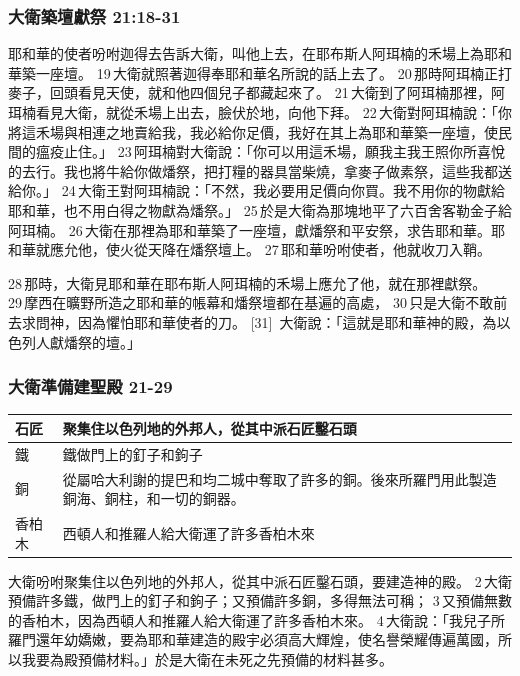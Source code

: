 \subsubsection{大衛築壇獻祭 21:18-31}
耶和華的使者吩咐迦得去告訴大衛，叫他上去，在耶布斯人阿珥楠的禾場上為耶和華築一座壇。 19 大衛就照著迦得奉耶和華名所說的話上去了。 20 那時阿珥楠正打麥子，回頭看見天使，就和他四個兒子都藏起來了。 21 大衛到了阿珥楠那裡，阿珥楠看見大衛，就從禾場上出去，臉伏於地，向他下拜。 22 大衛對阿珥楠說：「你將這禾場與相連之地賣給我，我必給你足價，我好在其上為耶和華築一座壇，使民間的瘟疫止住。」 23 阿珥楠對大衛說：「你可以用這禾場，願我主我王照你所喜悅的去行。我也將牛給你做燔祭，把打糧的器具當柴燒，拿麥子做素祭，這些我都送給你。」 24 大衛王對阿珥楠說：「不然，我必要用足價向你買。我不用你的物獻給耶和華，也不用白得之物獻為燔祭。」 25 於是大衛為那塊地平了六百舍客勒金子給阿珥楠。 26 大衛在那裡為耶和華築了一座壇，獻燔祭和平安祭，求告耶和華。耶和華就應允他，使火從天降在燔祭壇上。 27 耶和華吩咐使者，他就收刀入鞘。

28 那時，大衛見耶和華在耶布斯人阿珥楠的禾場上應允了他，就在那裡獻祭。 29 摩西在曠野所造之耶和華的帳幕和燔祭壇都在基遍的高處， 30 只是大衛不敢前去求問神，因為懼怕耶和華使者的刀。 [31]  大衛說：「這就是耶和華神的殿，為以色列人獻燔祭的壇。」


\subsubsection{大衛準備建聖殿 21-29}

\begin{table}
\vspace{-5mm}
\centering
\begin{tabular}{p{1.25cm}|p{8cm}}\hline\hline
石匠 &聚集住以色列地的外邦人，從其中派石匠鑿石頭  \\\hline\hline
鐵&鐵做門上的釘子和鉤子\\\hline 
銅&從屬哈大利謝的提巴和均二城中奪取了許多的銅。後來所羅門用此製造銅海、銅柱，和一切的銅器。 \\\hline
香柏木&西頓人和推羅人給大衛運了許多香柏木來\\\hline\hline
\end{tabular}
\end{table}	 
大衛吩咐聚集住以色列地的外邦人，從其中派石匠鑿石頭，要建造神的殿。 2 大衛預備許多鐵，做門上的釘子和鉤子；又預備許多銅，多得無法可稱； 3 又預備無數的香柏木，因為西頓人和推羅人給大衛運了許多香柏木來。 4 大衛說：「我兒子所羅門還年幼嬌嫩，要為耶和華建造的殿宇必須高大輝煌，使名譽榮耀傳遍萬國，所以我要為殿預備材料。」於是大衛在未死之先預備的材料甚多。




